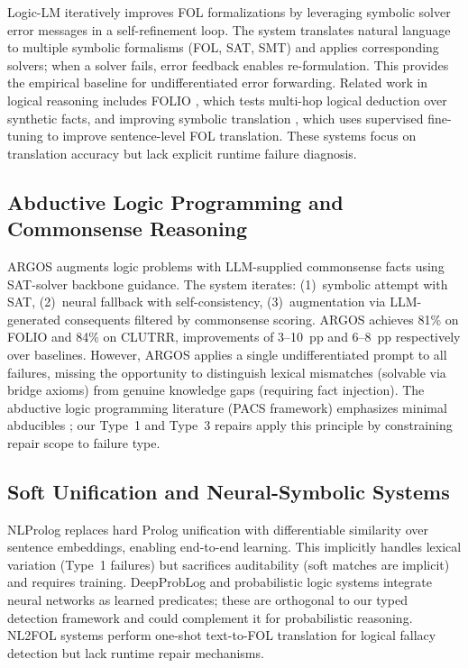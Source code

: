 \documentclass[11pt,letterpaper]{article}
\begin{document}
Logic-LM \citep{Pan2023} iteratively improves FOL formalizations by leveraging symbolic solver error messages in a self-refinement loop. The system translates natural language to multiple symbolic formalisms (FOL, SAT, SMT) and applies corresponding solvers; when a solver fails, error feedback enables re-formulation. This provides the empirical baseline for undifferentiated error forwarding. Related work in logical reasoning includes FOLIO \citep{Han2022}, which tests multi-hop logical deduction over synthetic facts, and improving symbolic translation \citep{Khashabi2021}, which uses supervised fine-tuning to improve sentence-level FOL translation. These systems focus on translation accuracy but lack explicit runtime failure diagnosis.

\subsection{Abductive Logic Programming and Commonsense Reasoning}

ARGOS \citep{Cotnareanu2026} augments logic problems with LLM-supplied commonsense facts using SAT-solver backbone guidance. The system iterates: (1)~symbolic attempt with SAT, (2)~neural fallback with self-consistency, (3)~augmentation via LLM-generated consequents filtered by commonsense scoring. ARGOS achieves 81\% on FOLIO and 84\% on CLUTRR, improvements of 3--10~pp and 6--8~pp respectively over baselines. However, ARGOS applies a single undifferentiated prompt to all failures, missing the opportunity to distinguish lexical mismatches (solvable via bridge axioms) from genuine knowledge gaps (requiring fact injection). The abductive logic programming literature (PACS framework) emphasizes minimal abducibles \citep{Thawani2020}; our Type~1 and Type~3 repairs apply this principle by constraining repair scope to failure type.

\subsection{Soft Unification and Neural-Symbolic Systems}

NLProlog \citep{Weber2019} replaces hard Prolog unification with differentiable similarity over sentence embeddings, enabling end-to-end learning. This implicitly handles lexical variation (Type~1 failures) but sacrifices auditability (soft matches are implicit) and requires training. DeepProbLog \citep{Manhaeve2018} and probabilistic logic systems integrate neural networks as learned predicates; these are orthogonal to our typed detection framework and could complement it for probabilistic reasoning. NL2FOL systems \citep{Hao2022} perform one-shot text-to-FOL translation for logical fallacy detection but lack runtime repair mechanisms.
\end{document}

